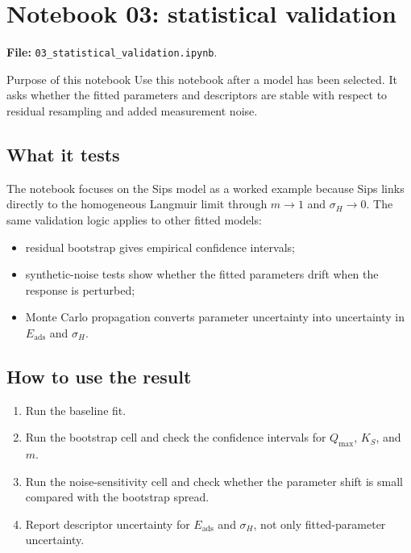 \documentclass[journal=jacsat,manuscript=article]{achemso}
\begin{document}
\section{Notebook 03: statistical validation}
\label{app:si_notebook_03}

\noindent\textbf{File:} \texttt{03\_statistical\_validation.ipynb}.

\begin{bluebox}{Purpose of this notebook}
	Use this notebook after a model has been selected. It asks whether the
	fitted parameters and descriptors are stable with respect to residual
	resampling and added measurement noise.
\end{bluebox}

\subsection*{What it tests}

The notebook focuses on the Sips model as a worked example because Sips links
directly to the homogeneous Langmuir limit through \(m\to 1\) and
\(\sigma_H\to 0\). The same validation logic applies to other fitted models:
\begin{itemize}
	\item residual bootstrap gives empirical confidence intervals;
	\item synthetic-noise tests show whether the fitted parameters drift when
	the response is perturbed;
	\item Monte Carlo propagation converts parameter uncertainty into
	uncertainty in \(E_{\mathrm{ads}}\) and \(\sigma_H\).
\end{itemize}

\subsection*{How to use the result}

\begin{enumerate}
	\item Run the baseline fit.
	\item Run the bootstrap cell and check the confidence intervals for
	\(Q_{\max}\), \(K_S\), and \(m\).
	\item Run the noise-sensitivity cell and check whether the parameter shift
	is small compared with the bootstrap spread.
	\item Report descriptor uncertainty for \(E_{\mathrm{ads}}\) and
	\(\sigma_H\), not only fitted-parameter uncertainty.
\end{enumerate}
\end{document}
